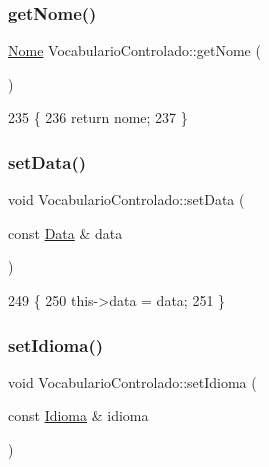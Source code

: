 \subsubsection{\texorpdfstring{get\+Nome()}{getNome()}}
{\footnotesize\ttfamily \mbox{\hyperlink{class_nome}{Nome}} Vocabulario\+Controlado\+::get\+Nome (\begin{DoxyParamCaption}{ }\end{DoxyParamCaption})\hspace{0.3cm}{\ttfamily [inline]}}


\begin{DoxyCode}
235   \{
236     \textcolor{keywordflow}{return} nome;
237   \}
\end{DoxyCode}
\mbox{\label{class_vocabulario_controlado_ad59afd1d3c7e7187597cc0b61dd26328}} 
\subsubsection{\texorpdfstring{set\+Data()}{setData()}}
{\footnotesize\ttfamily void Vocabulario\+Controlado\+::set\+Data (\begin{DoxyParamCaption}\item[{const \mbox{\hyperlink{class_data}{Data}} \&}]{data }\end{DoxyParamCaption})\hspace{0.3cm}{\ttfamily [inline]}}


\begin{DoxyCode}
249   \{
250     this->data = data;
251   \}
\end{DoxyCode}
\mbox{\label{class_vocabulario_controlado_ab8b9dba88aaead783d012ed7254859ba}} 
\subsubsection{\texorpdfstring{set\+Idioma()}{setIdioma()}}
{\footnotesize\ttfamily void Vocabulario\+Controlado\+::set\+Idioma (\begin{DoxyParamCaption}\item[{const \mbox{\hyperlink{class_idioma}{Idioma}} \&}]{idioma }\end{DoxyParamCaption})\hspace{0.3cm}{\ttfamily [inline]}}


